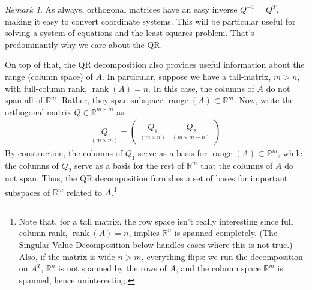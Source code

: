 \documentclass[12pt]{article}
\numberwithin{equation}{section} %
\theoremstyle{plain}
\theoremstyle{definition}
\theoremstyle{remark}
\newtheorem*{rmk}{Remark}
\newcommand{\R}{\mathbb{R}}
\newcommand{\Rn}{\mathbb{R}^n}
\newcommand{\Rm}{\mathbb{R}^m}
\newcommand{\range}{\operatorname{range}}
\newcommand{\rank}{\operatorname{rank}}
\begin{document}
\begin{rmk}
As always, orthogonal matrices have an easy inverse $Q^{-1}=Q^T$, making
it easy to convert coordinate systems. This will be particular useful
for solving a system of equations and the least-squares problem. That's
predominantly why we care about the QR.

On top of that, the QR decomposition also provides useful information
about the range (column space) of $A$. In particular, suppose
we have a tall-matrix, $m>n$, with full-column rank, $\rank(A)=n$. In
this case, the columns of $A$ do not span all of $\Rm$. Rather, they
span subspace $\range(A)\subset \Rm$. Now, write the orthogonal matrix
$Q\in\R^{m\times m}$ as
\begin{align*}
  \underset{(m\times m)}{Q} =
  \begin{pmatrix}
    \underset{(m\times n)}{Q_1}
    & \underset{(m\times m-n)}{Q_2}
  \end{pmatrix}
\end{align*}
By construction, the columns of $Q_1$ serve as a basis for
$\range(A)\subset\Rm$, while the columns of $Q_2$ serve as a basis for
the rest of $\Rm$ that the columns of $A$ do not span. Thus, the QR
decomposition furnishes a set of bases for important subspaces of
$\Rm$ related to $A$.\footnote{%
  Note that, for a tall matrix, the row space isn't really interesting
  since full column rank, $\rank(A)=n$, implies $\Rn$ is spanned
  completely. (The Singular Value Decomposition below handles cases
  where this is not true.) Also, if the matrix is wide $n>m$, everything
  flips: we run the decomposition on $A^T$, $\Rn$ is not spanned by the
  rows of $A$, and the column space $\Rm$ is spanned, hence
  uninteresting.
}
\end{rmk}
\end{document}
